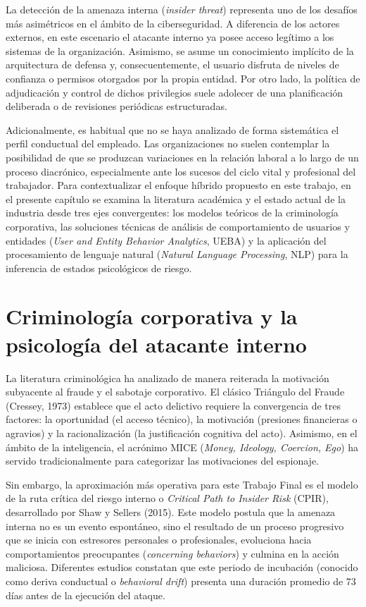 \documentclass[IB]{TFUOC}%
\begin{document}
La detección de la amenaza interna (\textit{insider threat}) representa uno de los desafíos más asimétricos en el ámbito de la ciberseguridad. A diferencia de los actores externos, en este escenario el atacante interno ya posee acceso legítimo a los sistemas de la organización. Asimismo, se asume un conocimiento implícito de la arquitectura de defensa y, consecuentemente, el usuario disfruta de niveles de confianza o permisos otorgados por la propia entidad. Por otro lado, la política de adjudicación y control de dichos privilegios suele adolecer de una planificación deliberada o de revisiones periódicas estructuradas. 

\medskip
\noindent Adicionalmente, es habitual que no se haya analizado de forma sistemática el perfil conductual del empleado. Las organizaciones no suelen contemplar la posibilidad de que se produzcan variaciones en la relación laboral a lo largo de un proceso diacrónico, especialmente ante los sucesos del ciclo vital y profesional del trabajador. Para contextualizar el enfoque híbrido propuesto en este trabajo, en el presente capítulo se examina la literatura académica y el estado actual de la industria desde tres ejes convergentes: los modelos teóricos de la criminología corporativa, las soluciones técnicas de análisis de comportamiento de usuarios y entidades (\textit{User and Entity Behavior Analytics}, UEBA) y la aplicación del procesamiento de lenguaje natural (\textit{Natural Language Processing}, NLP) para la inferencia de estados psicológicos de riesgo.

\section{Criminología corporativa y la psicología del atacante interno}

La literatura criminológica ha analizado de manera reiterada la motivación subyacente al fraude y el sabotaje corporativo. El clásico Triángulo del Fraude (Cressey, 1973) establece que el acto delictivo requiere la convergencia de tres factores: la oportunidad (el acceso técnico), la motivación (presiones financieras o agravios) y la racionalización (la justificación cognitiva del acto). Asimismo, en el ámbito de la inteligencia, el acrónimo MICE (\textit{Money, Ideology, Coercion, Ego}) ha servido tradicionalmente para categorizar las motivaciones del espionaje.

\medskip
\noindent Sin embargo, la aproximación más operativa para este Trabajo Final es el modelo de la ruta crítica del riesgo interno o \textit{Critical Path to Insider Risk} (CPIR), desarrollado por Shaw y Sellers (2015). Este modelo postula que la amenaza interna no es un evento espontáneo, sino el resultado de un proceso progresivo que se inicia con estresores personales o profesionales, evoluciona hacia comportamientos preocupantes (\textit{concerning behaviors}) y culmina en la acción maliciosa. Diferentes estudios constatan que este periodo de incubación (conocido como deriva conductual o \textit{behavioral drift}) presenta una duración promedio de 73 días antes de la ejecución del ataque.
\end{document}
